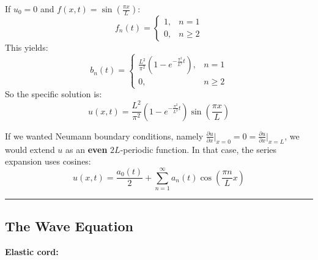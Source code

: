 \begin{example}
If $u_0 = 0$ and $f(x,t) = \sin\left(\frac{\pi x}{L}\right)$:
\begin{equation*}
    f_n(t) = 
    \begin{cases} 
    1, & n = 1 \\ 
    0, & n \ge 2 
    \end{cases}
\end{equation*}
This yields:
\begin{equation*}
    b_n(t) = 
    \begin{cases} 
    \frac{L^2}{\pi^2} \left(1 - e^{-\frac{\pi^2}{L^2}t}\right), & n = 1 \\ 
    0, & n \ge 2 
    \end{cases}
\end{equation*}
So the specific solution is:
\begin{equation*}
    u(x,t) = \frac{L^2}{\pi^2} \left(1 - e^{-\frac{\pi^2}{L^2}t}\right) \sin\left(\frac{\pi x}{L}\right)
\end{equation*}
\end{example}

\begin{remark}
If we wanted Neumann boundary conditions, namely $\frac{\partial u}{\partial x}\big|_{x=0} = 0 = \frac{\partial u}{\partial x}\big|_{x=L}$, we would extend $u$ as an \textbf{even} $2L$-periodic function. In that case, the series expansion uses cosines:
\begin{equation*}
    u(x,t) = \frac{a_0(t)}{2} + \sum_{n=1}^{\infty} a_n(t) \cos\left(\frac{\pi n}{L} x\right)
\end{equation*}
\end{remark}

\vspace{1em}
\hrule
\vspace{1em}

\subsection{The Wave Equation}

\textbf{Elastic cord:}

